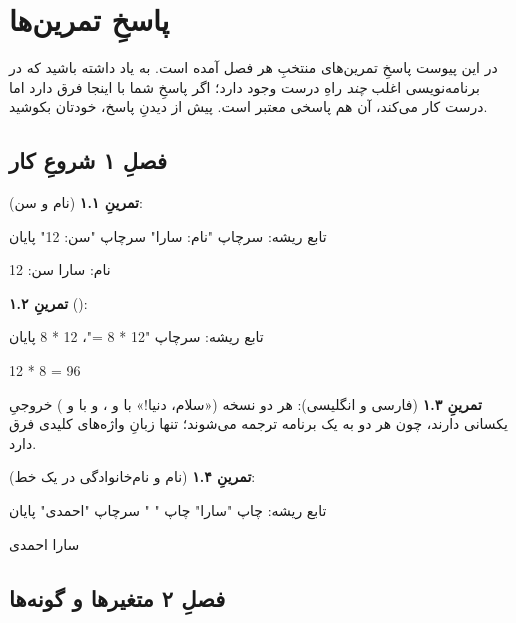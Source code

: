 \chapter{پاسخِ تمرین‌ها}%
\label{app:solutions}

در این پیوست پاسخِ تمرین‌های منتخبِ هر فصل آمده است. به یاد داشته باشید که در
برنامه‌نویسی اغلب \emph{چند} راهِ درست وجود دارد؛ اگر پاسخِ شما با اینجا فرق
دارد اما درست کار می‌کند، آن هم پاسخی معتبر است. پیش از دیدنِ پاسخ، خودتان
بکوشید.

\section*{فصلِ ۱ شروعِ کار}
{}

\textbf{تمرینِ ۱.۱} (نام و سن):
\begin{salamfa}
تابع ریشه:
    سرچاپ "نام: سارا"
    سرچاپ "سن: 12"
پایان
\end{salamfa}

\begin{progoutfa}
نام: سارا
سن: 12
\end{progoutfa}

\textbf{تمرینِ ۱.۲} ():
\begin{salamfa}
تابع ریشه:
    سرچاپ "12 * 8 ="، 12 * 8
پایان
\end{salamfa}

\begin{progoutfa}
12 * 8 = 96
\end{progoutfa}

\textbf{تمرینِ ۱.۳} (فارسی و انگلیسی): هر دو نسخه («سلام، دنیا!» با  و ، و با  و ) خروجیِ یکسانی دارند، چون هر دو به یک برنامه ترجمه می‌شوند؛ تنها زبانِ واژه‌های کلیدی فرق دارد.

\textbf{تمرینِ ۱.۴} (نام و نام‌خانوادگی در یک خط):
\begin{salamfa}
تابع ریشه:
    چاپ "سارا"
    چاپ " "
    سرچاپ "احمدی"
پایان
\end{salamfa}

\begin{progoutfa}
سارا احمدی
\end{progoutfa}

\section*{فصلِ ۲ متغیرها و گونه‌ها}
{}

